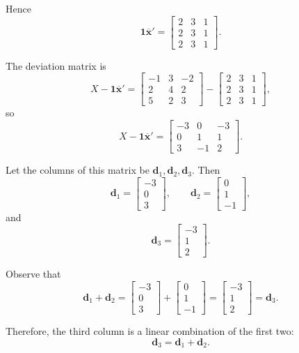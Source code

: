 \documentclass[12pt,a4paper]{article}
\newcommand{\one}{\mathbf{1}}
\begin{document}
Hence
\[
\one\overline{\mathbf{x}}'
=
\begin{bmatrix}
2&3&1\\
2&3&1\\
2&3&1
\end{bmatrix}.
\]

The deviation matrix is
\[
X-\one\overline{\mathbf{x}}'
=
\begin{bmatrix}
-1&3&-2\\
2&4&2\\
5&2&3
\end{bmatrix}
-
\begin{bmatrix}
2&3&1\\
2&3&1\\
2&3&1
\end{bmatrix},
\]
so
\[
\boxed{
X-\one\overline{\mathbf{x}}'
=
\begin{bmatrix}
-3&0&-3\\
0&1&1\\
3&-1&2
\end{bmatrix}}.
\]

Let the columns of this matrix be \(\mathbf{d}_1,\mathbf{d}_2,\mathbf{d}_3\). Then
\[
\mathbf{d}_1=
\begin{bmatrix}
-3\\0\\3
\end{bmatrix},
\qquad
\mathbf{d}_2=
\begin{bmatrix}
0\\1\\-1
\end{bmatrix},
\]
and
\[
\mathbf{d}_3=
\begin{bmatrix}
-3\\1\\2
\end{bmatrix}.
\]

Observe that
\[
\mathbf{d}_1+\mathbf{d}_2
=
\begin{bmatrix}
-3\\0\\3
\end{bmatrix}
+
\begin{bmatrix}
0\\1\\-1
\end{bmatrix}
=
\begin{bmatrix}
-3\\1\\2
\end{bmatrix}
=
\mathbf{d}_3.
\]

Therefore, the third column is a linear combination of the first two:
\[
\boxed{\mathbf{d}_3=\mathbf{d}_1+\mathbf{d}_2}.
\]
\end{document}
